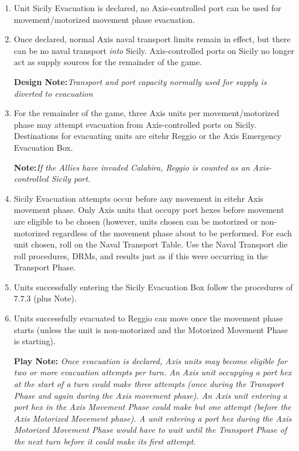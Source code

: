 \begin{enumerate}[label=\alph*.]
    \item Unit Sicily Evacuation is declared, no Axis-controlled port can be used for movement/motorized movement phase evacuation.
    \item Once declared, normal Axis naval transport limits remain in effect, but there can be no naval transport \textit{into} Sicily. Axis-controlled ports on Sicily no longer act as supply sources for the remainder of the game.
    
    \textbf{Design Note:}\textit{Transport and port capacity normally used for supply is diverted to evacuation}
    
    \item For the remainder of the game, three Axis units per movement/motorized phase may attempt evacuation from Axis-controlled ports on Sicily. Destinations for evacuating units are eitehr Reggio or the Axis Emergency Evacuation Box.
    
    \textbf{Note:}\textit{If the Allies have invaded Calabira, Reggio is counted as an Axis-controlled Sicily port.}
    
    \item Sicily Evacuation attempts occur before any movement in eitehr Axis movement phase. Only Axis units that occupy port hexes before movement are eligible to be chosen (however, units chosen can be motorized or non-motorized regardless of the movement phase about to be performed. For each unit chosen, roll on the Naval Transport Table. Use the Naval Transport die roll procedures, DRMs, and results just as if this were occurring in the Transport Phase.
    
    \item Units successfully entering the Sicily Evacuation Box follow the procedures of 7.7.3 (plus Note).
    
    \item Units successfully evacuated to Reggio can move once the movement phase starts (unless the unit is non-motorized and the Motorized Movement Phase is starting).
    
    \textbf{Play Note:} \textit{Once evacuation is declared, Axis units may become eligible for two or more evacuation attempts per turn. An Axis unit occupying a port hex at the start of a turn could make three attempts (once during the Transport Phase and again during the Axis movement phase). An Axis unit entering a port hex in the Axis Movement Phase could make but one attempt (before the Axis Motorized Movement phase). A unit entering a port hex during the Axis Motorized Movement Phase would have to wait until the Transport Phase of the next turn before it could make its first attempt.}
\end{enumerate}